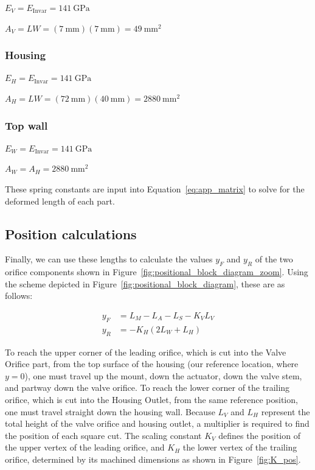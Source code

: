 \documentclass[12pt, letterpaper]{report}%
\newcounter{mycounter}           %
\newcounter{sub}[mycounter]      %
\newcommand{\specEInv}{\SI{141}{\giga \pascal}}
\begin{document}
\begin{appendices}
			$E_V = E_{\text{Invar}} = \specEInv $
			
			$A_V = LW = (\SI{7}{\milli\meter}) (\SI{7}{\milli\meter}) = \SI{49}{\milli\meter\squared}$
			
			\subsubsection{Housing}    
			\label{app:sat:TF:force_balance:H}

				$E_H = E_{\text{Invar}} = \specEInv $

				$A_H = LW = (\SI{72}{\milli\meter}) (\SI{40}{\milli\meter}) = \SI{2880}{\milli\meter\squared}$

			\subsubsection{Top wall}
			\label{app:sat:TF:force_balance:W}

				$E_W = E_{\text{Invar}} = \specEInv $

				$A_W = A_H = \SI{2880}{\milli\meter\squared}$

			These spring constants are input into Equation~\eqref{eq:app_matrix} to solve for the deformed length of each part.

		\subsection{Position calculations}
		\label{app:sat:TF:pos}

			Finally, we can use these lengths to calculate the values $y_F$ and $y_R$ of the two orifice components shown in Figure~\ref{fig:positional_block_diagram_zoom}.
			Using the scheme depicted in Figure~\ref{fig:positional_block_diagram}, these are as follows:

				\begin{align}
					y_F &= L_M - L_A - L_S - K_V L_V \label{eq:yF}\\
					y_R &= - K_H (2 L_W + L_H) \label{eq:yR}
				\end{align}

			To reach the upper corner of the leading orifice, which is cut into the Valve Orifice part, from the top surface of the housing (our reference location, where $y=0$),
			one must travel up the mount, down the actuator, down the valve stem, and partway down the valve orifice.
			To reach the lower corner of the trailing orifice, which is cut into the Housing Outlet, from the same reference position,
			one must travel straight down the housing wall.
			Because $L_V$ and $L_H$ represent the total height of the valve orifice and housing outlet, a multiplier is required to find the position of each square cut.
			The scaling constant $K_V$ defines the position of the upper vertex of the leading orifice, and $K_H$ the lower vertex of the trailing orifice, determined by its machined dimensions as shown in Figure~\ref{fig:K_pos}.


\end{appendices}
\end{document}

